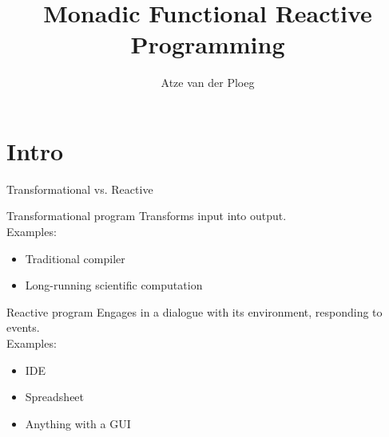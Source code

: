 \documentclass{beamer}
\title{Monadic Functional Reactive Programming}
\author{Atze van der Ploeg}
\institute{
Centrum Wiskunde \& Informatica, Amsterdam, The Netherlands}
\begin{document}



\begin{frame}[plain]
\begin{center}
  \scalebox{12}{$\bind$}
\end{center}
\vspace{-0.5cm}
  \titlepage
\end{frame}

\section{Intro}



\newcommand{\inlineitem}{%
{\color{navyblue} \leavevmode\usebeamertemplate{itemize item} }
}

\begin{frame}{Transformational vs. Reactive}
\begin{block}{Transformational program}
Transforms input into output.\\

Examples:
\begin{itemize}
\item Traditional compiler
\item Long-running scientific computation
\end{itemize}
\end{block}

\begin{block}{Reactive program}
Engages in a dialogue with its environment, responding to events.\\

Examples:
\begin{itemize}
\item IDE
\item Spreadsheet
\item Anything with a GUI
\end{itemize}
\end{block}
\end{frame}
\end{document}
